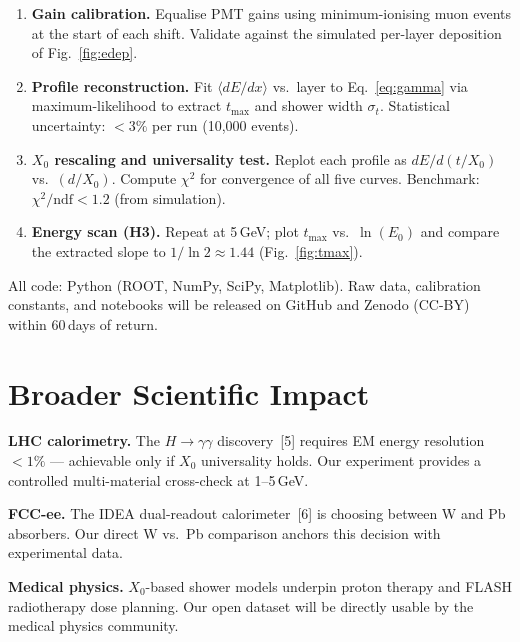 \documentclass[11pt,a4paper]{article}
\begin{document}
\begin{enumerate}[leftmargin=2em, label=\textbf{\arabic*.}, itemsep=4pt]

  \item \textbf{Gain calibration.}
        Equalise PMT gains using minimum-ionising muon events at the start
        of each shift. Validate against the simulated per-layer deposition
        of Fig.~\ref{fig:edep}.

  \item \textbf{Profile reconstruction.}
        Fit $\langle dE/dx\rangle$ vs.\ layer to Eq.~\eqref{eq:gamma}
        via maximum-likelihood to extract $t_{\max}$ and shower width
        $\sigma_t$. Statistical uncertainty: $<3\%$ per run (10,000 events).

  \item \textbf{$X_0$ rescaling and universality test.}
        Replot each profile as $dE/d(t/X_0)$ vs.\ $(d/X_0)$. Compute
        $\chi^2$ for convergence of all five curves. Benchmark:
        $\chi^2/\mathrm{ndf} < 1.2$ (from simulation).

  \item \textbf{Energy scan (H3).}
        Repeat at 5\,GeV; plot $t_{\max}$ vs.\ $\ln(E_0)$ and compare the
        extracted slope to $1/\ln 2\approx1.44$ (Fig.~\ref{fig:tmax}).

\end{enumerate}

All code: Python (ROOT, NumPy, SciPy, Matplotlib). Raw data, calibration
constants, and notebooks will be released on GitHub and Zenodo (CC-BY)
within 60\,days of return.

\section{Broader Scientific Impact}
\label{sec:impact}

\textbf{LHC calorimetry.}
The $H\to\gamma\gamma$ discovery~[5] requires EM energy resolution
$<1\%$ --- achievable only if $X_0$ universality holds.  Our experiment
provides a controlled multi-material cross-check at 1--5\,GeV.

\textbf{FCC-ee.}
The IDEA dual-readout calorimeter~[6] is choosing between W and Pb
absorbers.  Our direct W vs.\ Pb comparison anchors this decision with
experimental data.

\textbf{Medical physics.}
$X_0$-based shower models underpin proton therapy and FLASH radiotherapy
dose planning.  Our open dataset will be directly usable by the medical
physics community.
\end{document}

